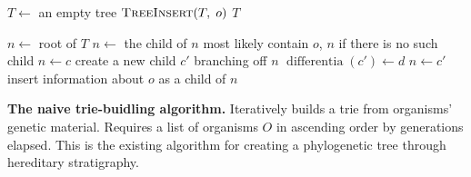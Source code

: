 \begin{algorithm}[h]
    \begin{algorithmic}[1]
            \State $T \gets$ an empty tree
                \State $\textsc{TreeInsert}(T,\; o)$
            \EndFor
            \State \Return $T$
        \EndFunction

            \State $n \gets$ root of $T$
                \State $n \gets$ the child of $n$ most likely contain $o$, $n$ if there is no such child
                    \State $n \gets c$
                \Else 
                    \State create a new child $c'$ branching off $n$ 
                    \State $\operatorname{differentia}(c') \gets d$
                    \State $n \gets c'$
                \EndIf
            \EndFor
            \State insert information about $o$ as a child of $n$
        \EndFunction
    \end{algorithmic}
    \caption{\textbf{The naive trie-buidling algorithm.} \small Iteratively builds a trie from organisms' genetic material. Requires a list of organisms $O$ in ascending order by generations elapsed. This is the existing algorithm for creating a phylogenetic tree through hereditary stratigraphy. \vspace{-1.5em}}
    \label{alg:old}
\end{algorithm}
